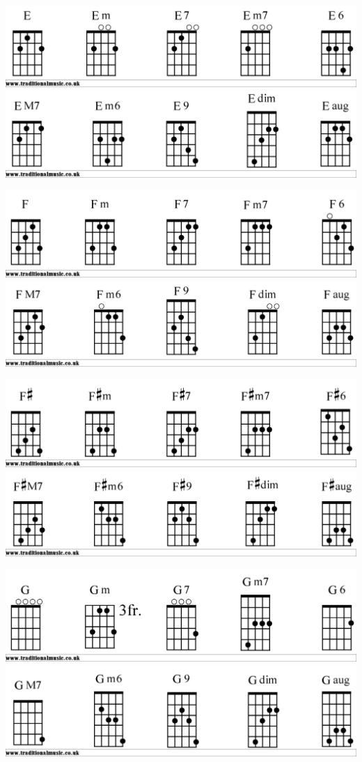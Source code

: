 \includegraphics[scale=.15]{Ebjo1}
\includegraphics[scale=.15]{Ebjo2}

\includegraphics[scale=.15]{Fbjo1}
\includegraphics[scale=.15]{Fbjo2}

\includegraphics[scale=.15]{Fsbjo1}
\includegraphics[scale=.15]{Fsbjo2}

\includegraphics[scale=.15]{Gbjo1}
\includegraphics[scale=.15]{Gbjo2}

